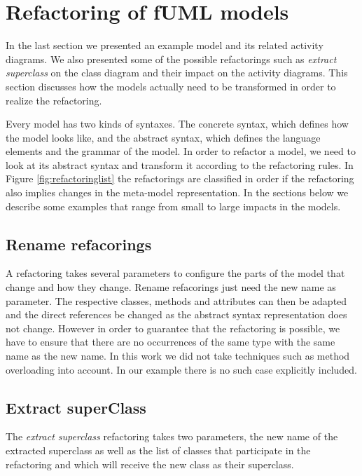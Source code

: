 \documentclass{llncs}
\begin{document}
\section{Refactoring of fUML models}
\label{sec:fuml-refactoring}

In the last section we presented an example model and its related activity diagrams. We also presented some of the possible 
refactorings such as \textit{extract superclass} on the class diagram and their impact on the activity diagrams. This 
section discusses how the models actually need to be transformed in order to realize the refactoring.

Every model has two kinds of syntaxes. The concrete syntax, which defines how the model looks like, and the abstract
syntax, which defines the language elements and the grammar of the model. In order to refactor a model, we need to look 
at its abstract syntax and transform it according to the refactoring rules. In Figure \ref{fig:refactoringlist} the 
refactorings are classified in order if the refactoring also implies changes in the meta-model representation. In the 
sections below we describe some examples that range from small to large impacts in the models.

\subsection{Rename refacorings}
\label{sec:renames}
A refactoring takes several parameters to configure the parts of the model that change and how they change. Rename 
refacorings just need the new name as parameter. The respective classes, methods and attributes can then be adapted 
and the direct references be changed as the abstract syntax representation does not change. However in order to guarantee that the 
refactoring is possible, we have to ensure that there are no occurrences of the same type with the same name as the 
new name. In this work we did not take techniques such as method overloading into account. In our example there is 
no such case explicitly included.

\subsection{Extract superClass}
\label{sec:extract}
The \textit{extract superclass} refactoring takes two parameters, the new name of the extracted superclass as well as
the list of classes that participate in the refactoring and which will receive the new class as their superclass.
\end{document}
